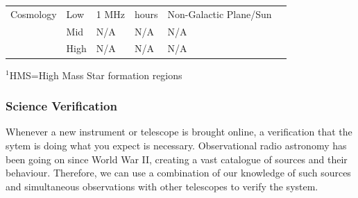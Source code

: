 \begin{table}
\begin{tabular}{|l|llll|l|}
\hline
Cosmology             & Low                    & 1 MHz              & hours                &  Non-Galactic Plane/Sun  &                                                                                                       \\
                      & Mid                    & N/A              & N/A           & N/A &                                                                                                       \\
                      & High                   & N/A              & N/A            &         N/A &                                                                            \\
\hline
\end{tabular}
$^{1}$HMS=High Mass Star formation regions
\end{table}


\subsubsection{Science Verification}

Whenever a new instrument or telescope is brought online, a verification that the sytem is doing what you expect is necessary. Observational radio astronomy has been going on since World War II, creating a vast catalogue of sources and their behaviour. Therefore, we can use a combination of our knowledge of such sources and simultaneous observations with other telescopes to verify the system. 



